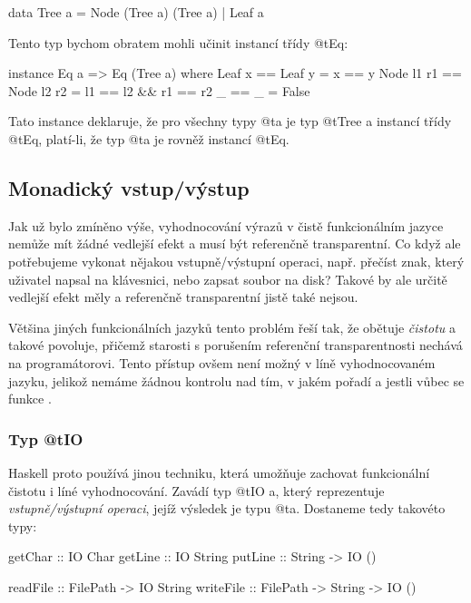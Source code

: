 \begin{haskell}
data Tree a = Node (Tree a) (Tree a) | Leaf a
\end{haskell}

Tento typ bychom obratem mohli učinit instancí třídy @t{Eq}:

\begin{haskell}
instance Eq a => Eq (Tree a) where
  Leaf x == Leaf y         = x == y
  Node l1 r1 == Node l2 r2 = l1 == l2 && r1 == r2
  _ == _ = False
\end{haskell}

Tato instance deklaruje, že pro všechny typy @t{a} je typ @t{Tree a} instancí
třídy @t{Eq}, platí-li, že typ @t{a} je rovněž instancí @t{Eq}.

\subsection{Monadický vstup/výstup}

Jak už bylo zmíněno výše, vyhodnocování výrazů v čistě funkcionálním jazyce
nemůže mít žádné vedlejší efekt a musí být referenčně transparentní. Co když ale
potřebujeme vykonat nějakou vstupně/výstupní operaci, např. přečíst znak, který
uživatel napsal na klávesnici, nebo zapsat soubor na disk? Takové  by
ale určitě vedlejší efekt měly a referenčně transparentní jistě také nejsou.

Většina jiných funkcionálních jazyků tento problém řeší tak, že obětuje
\emph{čistotu} a takové  povoluje, přičemž starosti s
porušením referenční transparentnosti nechává na programátorovi. Tento přístup
ovšem není možný v líně vyhodnocovaném jazyku, jelikož nemáme žádnou kontrolu
nad tím, v jakém pořadí a jestli vůbec se funkce .

\subsubsection{\texorpdfstring{Typ @t{IO}}{Typ IO}}

Haskell proto používá jinou techniku, která umožňuje zachovat funkcionální
čistotu i líné vyhodnocování. Zavádí typ @t{IO a}, který reprezentuje
\emph{vstupně/výstupní operaci}, jejíž výsledek je typu @t{a}. Dostaneme tedy
takovéto typy:

\begin{haskell}
getChar :: IO Char
getLine :: IO String
putLine :: String -> IO ()

readFile :: FilePath -> IO String
writeFile :: FilePath -> String -> IO ()
\end{haskell}

